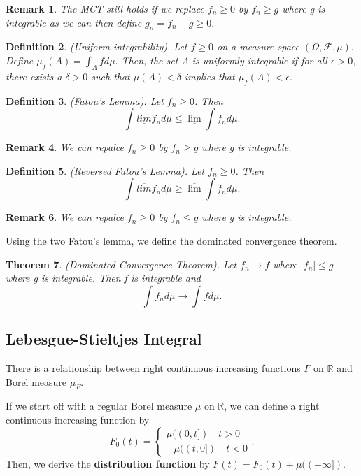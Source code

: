\documentclass[twoside]{article}
\newcounter{lecnum}
\newtheorem{theorem}{Theorem}[lecnum]
\newtheorem{definition}[theorem]{Definition}
\newtheorem{remark}[theorem]{Remark}
\newcommand{\sigmalgebra}{\mathcal{F}}
\begin{document}
\begin{remark}The MCT still holds if we replace $f_n \geq 0$ by $f_n \geq g$ where g is integrable as we can then define $g_n = f_n - g \geq 0.$
\end{remark}
\begin{definition}(Uniform integrability). Let $f \geq 0$ on a measure space $(\Omega, \sigmalgebra, \mu).$ Define $\mu_f(A) = \int_Afd\mu.$ Then, the set A is uniformly integrable if for all $\epsilon > 0$, there exists a $\delta > 0$ such that $\mu(A) < \delta$ implies that $\mu_f(A) < \epsilon.$
\end{definition}

\begin{definition}(Fatou's Lemma). Let $f_n \geq 0$. Then 
$$
\int \underline{lim}f_nd\mu \leq \underline{\lim}\int f_nd\mu.
$$
\end{definition}
\begin{remark}We can repalce $f_n \geq 0$ by $f_n \geq g$ where g is integrable.
\end{remark}

\begin{definition}(Reversed Fatou's Lemma). Let $f_n \geq 0$. Then 
$$
\int \overline{lim}f_nd\mu \geq \overline{\lim}\int f_nd\mu.
$$
\end{definition}

\begin{remark}We can repalce $f_n \geq 0$ by $f_n \leq g$ where g is integrable.
\end{remark}

Using the two Fatou's lemma, we define the dominated convergence theorem.
\begin{theorem}(Dominated Convergence Theorem). Let $f_n \rightarrow f$ where $|f_n| \leq g$ where g is integrable. 
Then f is integrable and 
$$
\int f_nd\mu \rightarrow \int fd\mu.
$$
\end{theorem}

\subsection{Lebesgue-Stieltjes Integral}



There is a relationship between right continuous increasing functions $F$ on $\mathbb{R}$ and Borel measure $\mu_F$. 

If we start off with a regular Borel measure $\mu$ on $\mathbb{R}$, we can define a right continuous increasing function by 
$$
F_0(t) = \begin{cases}
\mu((0,t]) \quad t > 0\\
-\mu((t,0]) \quad t < 0
\end{cases}.
$$
Then, we derive the \textbf{distribution function} by $F(t) = F_0(t) + \mu((-\infty]).$
\end{document}
